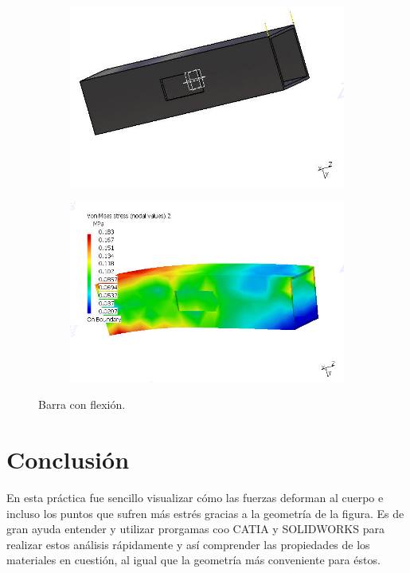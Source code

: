 \documentclass[12pt, letterpaper]{article}
\begin{document}
\begin{figure}[H]
	\centering
	\begin{subfigure}[b]{\linewidth}
		\includegraphics[width=\linewidth]{f1.png}
		\caption{}
	\end{subfigure}
	\begin{subfigure}[b]{\linewidth}
		\includegraphics[width=\linewidth]{f2.png}
		\caption{}
	\end{subfigure}
	\caption{Barra con flexión.}
\end{figure}


\section*{Conclusión}
En esta práctica fue sencillo visualizar cómo las fuerzas deforman al cuerpo e incluso los puntos que sufren más estrés gracias a la geometría de la figura. Es de gran ayuda entender y utilizar prorgamas coo CATIA y SOLIDWORKS para realizar estos análisis rápidamente y así comprender las propiedades de los materiales en cuestión, al igual que la geometría más conveniente para éstos.

\renewcommand\refname{Referencias}
\printbibliography
\end{document}
